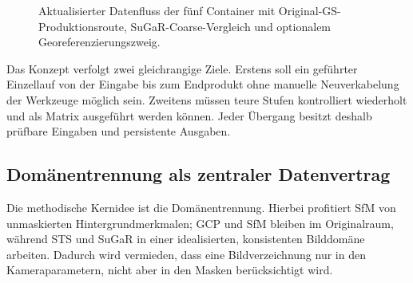 \begin{figure}[H]
{%
}
\caption{Aktualisierter Datenfluss der fünf Container mit Original-GS-
Produktionsroute, SuGaR-Coarse-Vergleich und optionalem
Georeferenzierungszweig.}
\label{fig:pa-pipeline-flow}
\end{figure}

Das Konzept verfolgt zwei gleichrangige Ziele. Erstens soll ein geführter
Einzellauf von der Eingabe bis zum Endprodukt ohne manuelle Neuverkabelung der
Werkzeuge möglich sein. Zweitens müssen teure Stufen kontrolliert wiederholt
und als Matrix ausgeführt werden können. Jeder Übergang besitzt deshalb
prüfbare Eingaben und persistente Ausgaben.

\subsection{Domänentrennung als zentraler Datenvertrag}

Die methodische Kernidee ist die Domänentrennung. Hierbei profitiert SfM von unmaskierten Hintergrundmerkmalen; GCP und SfM bleiben im
Originalraum, während STS und SuGaR in einer idealisierten, konsistenten
Bilddomäne arbeiten. Dadurch wird vermieden, dass eine Bildverzeichnung nur in den
Kameraparametern, nicht aber in den Masken berücksichtigt wird.

